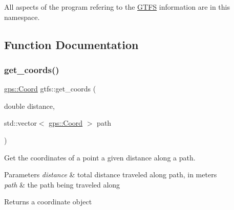 All aspects of the program refering to the \hyperlink{classgtfs_1_1GTFS}{G\+T\+FS} information are in this namespace. 

\subsection{Function Documentation}
\mbox{\label{namespacegtfs_aab5513b6c15b5c30de5f706a2e587ae4}} 
\subsubsection{\texorpdfstring{get\+\_\+coords()}{get\_coords()}}
{\footnotesize\ttfamily \hyperlink{classgps_1_1Coord}{gps\+::\+Coord} gtfs\+::get\+\_\+coords (\begin{DoxyParamCaption}\item[{double}]{distance,  }\item[{std\+::vector$<$ \hyperlink{classgps_1_1Coord}{gps\+::\+Coord} $>$}]{path }\end{DoxyParamCaption})}

Get the coordinates of a point a given distance along a path. 
\begin{DoxyParams}{Parameters}
{\em distance} & total distance traveled along path, in meters \\
\hline
{\em path} & the path being traveled along \\
\hline
\end{DoxyParams}
\begin{DoxyReturn}{Returns}
a coordinate object 
\end{DoxyReturn}
